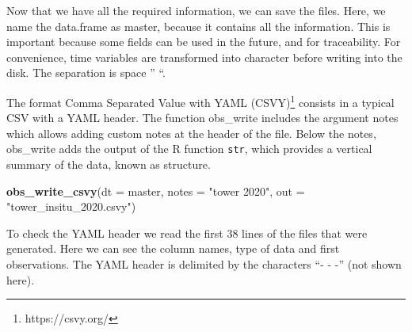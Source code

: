 \documentclass[preprint, 3p,
authoryear]{elsarticle} %
\newenvironment{Shaded}{\begin{snugshade}}{\end{snugshade}}
\newcommand{\AttributeTok}[1]{\textcolor[rgb]{0.13,0.29,0.53}{#1}}
\newcommand{\FunctionTok}[1]{\textcolor[rgb]{0.13,0.29,0.53}{\textbf{#1}}}
\newcommand{\NormalTok}[1]{#1}
\newcommand{\OtherTok}[1]{\textcolor[rgb]{0.56,0.35,0.01}{#1}}
\newcommand{\SpecialCharTok}[1]{\textcolor[rgb]{0.81,0.36,0.00}{\textbf{#1}}}
\newcommand{\StringTok}[1]{\textcolor[rgb]{0.31,0.60,0.02}{#1}}
\begin{document}
Now that we have all the required information, we can save the files.
Here, we name the data.frame as master, because it contains all the
information. This is important because some fields can be used in the
future, and for traceability. For convenience, time variables are
transformed into character before writing into the disk. The separation
is space '' ``.

\begin{Shaded}
\end{Shaded}

The format Comma Separated Value with YAML (CSVY)\footnote{https://csvy.org/}
consists in a typical CSV with a YAML header. The function obs\_write
includes the argument notes which allows adding custom notes at the
header of the file. Below the notes, obs\_write adds the output of the R
function \texttt{str}, which provides a vertical summary of the data,
known as structure.

\begin{Shaded}
\begin{Highlighting}[]
\FunctionTok{obs\_write\_csvy}\NormalTok{(}\AttributeTok{dt =}\NormalTok{ master,}
              \AttributeTok{notes =} \StringTok{"tower 2020"}\NormalTok{,}
              \AttributeTok{out =} \StringTok{"tower\_insitu\_2020.csvy"}\NormalTok{)}
\end{Highlighting}
\end{Shaded}

To check the YAML header we read the first 38 lines of the files that
were generated. Here we can see the column names, type of data and first
observations. The YAML header is delimited by the characters ``- - -''
(not shown here).
\end{document}
